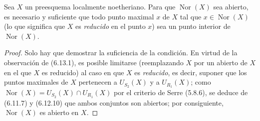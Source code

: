 \begin{proposition}[6.13.4]
\label{IV.2.s6.13.4-fr}
Sea $X$ un preesquema localmente noetheriano. Para que
$\operatorname{Nor}(X)$ sea abierto, es necesario y suficiente que todo
punto maximal $x$ de $X$ tal que $x\in\operatorname{Nor}(X)$ \textup{(lo que
significa que $X$ es \emph{reducido} en el punto $x$)} sea un punto interior de
$\operatorname{Nor}(X)$.
\end{proposition}

\begin{proof}
Solo hay que demostrar la suficiencia de la condición. En virtud de la
observación de (6.13.1), es posible limitarse (reemplazando $X$ por un
abierto de $X$ en el que $X$ es reducido) al caso en que $X$ es \emph{reducido},
es decir, suponer que los puntos maximales de $X$ pertenecen a
$U_{S_2}(X)$ y a $U_{R_1}(X)$; como
$\operatorname{Nor}(X)=U_{S_2}(X)\cap U_{R_1}(X)$ por el criterio de
Serre (5.8.6), se deduce de (6.11.7) y (6.12.10) que ambos conjuntos
son abiertos; por consiguiente, $\operatorname{Nor}(X)$ es abierto en $X$.
\end{proof}
